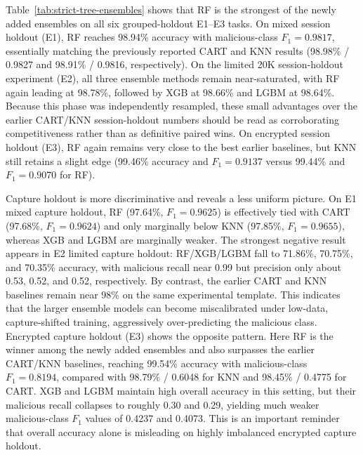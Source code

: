 \documentclass[letterpaper,twocolumn,10pt]{article}
\begin{document}
Table~\ref{tab:strict-tree-ensembles} shows that RF is the strongest of the newly added ensembles on all six grouped-holdout E1--E3 tasks. On mixed session holdout (E1), RF reaches 98.94\% accuracy with malicious-class $F_1=0.9817$, essentially matching the previously reported CART and KNN results (98.98\% / 0.9827 and 98.91\% / 0.9816, respectively). On the limited 20K session-holdout experiment (E2), all three ensemble methods remain near-saturated, with RF again leading at 98.78\%, followed by XGB at 98.66\% and LGBM at 98.64\%. Because this phase was independently resampled, these small advantages over the earlier CART/KNN session-holdout numbers should be read as corroborating competitiveness rather than as definitive paired wins. On encrypted session holdout (E3), RF again remains very close to the best earlier baselines, but KNN still retains a slight edge (99.46\% accuracy and $F_1=0.9137$ versus 99.44\% and $F_1=0.9070$ for RF).

Capture holdout is more discriminative and reveals a less uniform picture. On E1 mixed capture holdout, RF (97.64\%, $F_1=0.9625$) is effectively tied with CART (97.68\%, $F_1=0.9624$) and only marginally below KNN (97.85\%, $F_1=0.9655$), whereas XGB and LGBM are marginally weaker. The strongest negative result appears in E2 limited capture holdout: RF/XGB/LGBM fall to 71.86\%, 70.75\%, and 70.35\% accuracy, with malicious recall near 0.99 but precision only about 0.53, 0.52, and 0.52, respectively. By contrast, the earlier CART and KNN baselines remain near 98\% on the same experimental template. This indicates that the larger ensemble models can become miscalibrated under low-data, capture-shifted training, aggressively over-predicting the malicious class. Encrypted capture holdout (E3) shows the opposite pattern. Here RF is the winner among the newly added ensembles and also surpasses the earlier CART/KNN baselines, reaching 99.54\% accuracy with malicious-class $F_1=0.8194$, compared with 98.79\% / 0.6048 for KNN and 98.45\% / 0.4775 for CART. XGB and LGBM maintain high overall accuracy in this setting, but their malicious recall collapses to roughly 0.30 and 0.29, yielding much weaker malicious-class $F_1$ values of 0.4237 and 0.4073. This is an important reminder that overall accuracy alone is misleading on highly imbalanced encrypted capture holdout.
\end{document}
